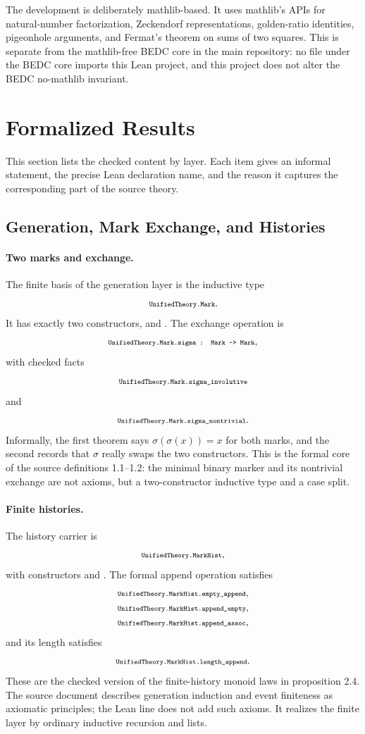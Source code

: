\documentclass[11pt]{article}
\newcommand{\lean}[1]{\relax\ifmmode\hbox{\scriptsize\ttfamily\detokenize{#1}}\else{\small\texttt{\detokenize{#1}}}\fi}
\begin{document}
The development is deliberately mathlib-based.  It uses mathlib's APIs for natural-number factorization, Zeckendorf representations, golden-ratio identities, pigeonhole arguments, and Fermat's theorem on sums of two squares.  This is separate from the mathlib-free BEDC core in the main repository: no file under the BEDC core imports this Lean project, and this project does not alter the BEDC no-mathlib invariant.

\section{Formalized Results}

This section lists the checked content by layer.  Each item gives an informal statement, the precise Lean declaration name, and the reason it captures the corresponding part of the source theory.

\subsection{Generation, Mark Exchange, and Histories}

\paragraph{Two marks and exchange.}
The finite basis of the generation layer is the inductive type
$$
  \lean{UnifiedTheory.Mark}.
$$
It has exactly two constructors, \lean{zero} and \lean{one}.  The exchange operation is
$$
  \lean{UnifiedTheory.Mark.sigma : Mark -> Mark},
$$
with checked facts
$$
  \lean{UnifiedTheory.Mark.sigma_involutive}
$$
and
$$
  \lean{UnifiedTheory.Mark.sigma_nontrivial}.
$$
Informally, the first theorem says $\sigma(\sigma(x))=x$ for both marks, and the second records that $\sigma$ really swaps the two constructors.  This is the formal core of the source definitions 1.1--1.2: the minimal binary marker and its nontrivial exchange are not axioms, but a two-constructor inductive type and a case split.

\paragraph{Finite histories.}
The history carrier is
$$
  \lean{UnifiedTheory.MarkHist},
$$
with constructors \lean{empty} and \lean{ext}.  The formal append operation satisfies
$$
  \begin{gathered}
  \lean{UnifiedTheory.MarkHist.empty_append},\\
  \lean{UnifiedTheory.MarkHist.append_empty},\\
  \lean{UnifiedTheory.MarkHist.append_assoc},
  \end{gathered}
$$
and its length satisfies
$$
  \lean{UnifiedTheory.MarkHist.length_append}.
$$
These are the checked version of the finite-history monoid laws in proposition 2.4.  The source document describes generation induction and event finiteness as axiomatic principles; the Lean line does not add such axioms.  It realizes the finite layer by ordinary inductive recursion and lists.
\end{document}
